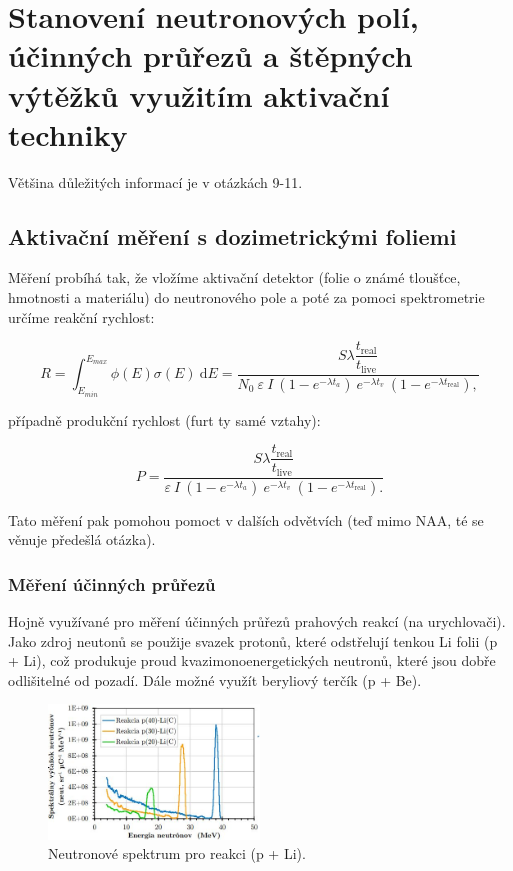 \section[Měření neutronů aktivační metodou]{Stanovení neutronových polí, účinných průřezů a štěpných výtěžků využitím aktivační techniky}

Většina důležitých informací je v otázkách 9-11.

\subsection{Aktivační měření s dozimetrickými foliemi}

Měření probíhá tak, že vložíme aktivační detektor (folie o známé tloušťce, hmotnosti a materiálu) do neutronového pole a poté za pomoci spektrometrie určíme reakční rychlost:

\begin{equation}
    \boxed{R = \int_{E_{min}}^{E_{max}} \phi(E) \sigma(E) \: \text{d}E = \dfrac{S \lambda \dfrac{t_\text{real}}{t_\text{live}}}{N_0 \: \varepsilon \: I \: (1-e^{-\lambda t_a}) \: e^{-\lambda t_v} \: (1-e^{-\lambda t_\text{real}}),}}
\end{equation}

případně produkční rychlost (furt ty samé vztahy):

\begin{equation}
    \boxed{P =  \dfrac{S \lambda \dfrac{t_\text{real}}{t_\text{live}}}{\varepsilon \: I \: (1-e^{-\lambda t_a}) \: e^{-\lambda t_v} \: (1-e^{-\lambda t_\text{real}}).}}
\end{equation}

Tato měření pak pomohou pomoct v dalších odvětvích (teď mimo NAA, té se věnuje předešlá otázka).

\subsubsection{Měření účinných průřezů}

Hojně využívané pro měření účinných průřezů prahových reakcí (na urychlovači). Jako zdroj neutonů se použije svazek protonů, které odstřelují tenkou Li folii (p + Li), což produkuje proud kvazimonoenergetických neutronů, které jsou dobře odlišitelné od pozadí. Dále možné využít beryliový terčík (p + Be).

\begin{figure}[H]
    \centering
    \includegraphics[width=0.5\textwidth]{img/p+Li_E.JPG}
    \caption{Neutronové spektrum pro reakci (p + Li).}
\end{figure}

